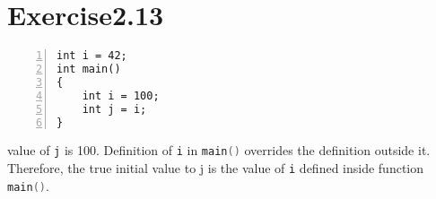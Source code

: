 \documentclass{article}
\begin{document}
    
\section*{Exercise2.13}

\begin{lstlisting}[numbers=left, basicstyle=\ttfamily, xleftmargin=2em]
int i = 42;
int main()
{
    int i = 100;
    int j = i;
}
\end{lstlisting}

\begin{flushleft}
value of \lstinline[language=C++]|j| is 100. Definition of \lstinline[language=C++]|i| in \lstinline[language=C++]|main()| overrides the definition outside it. Therefore, the true initial value to j is the value of \lstinline[language=C++]|i| defined inside function \lstinline[language=C++]|main()|.
\end{flushleft}
\end{document}
